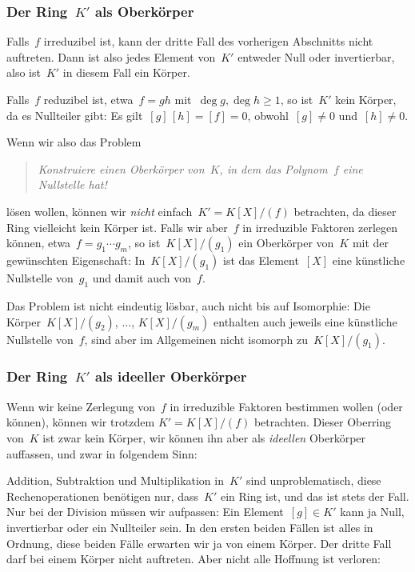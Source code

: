 \documentclass{../../alg2/algblatt}
\begin{document}
\subsubsection*{Der Ring~$K'$ als Oberkörper}

Falls~$f$ irreduzibel ist, kann der dritte Fall des vorherigen Abschnitts nicht
auftreten. Dann ist also jedes Element von~$K'$ entweder Null oder
invertierbar, also ist~$K'$ in diesem Fall ein Körper.

Falls~$f$ reduzibel ist, etwa~$f = gh$ mit~$\deg g, \deg h \geq 1$, so ist~$K'$
kein Körper, da es Nullteiler gibt: Es gilt~$[g]\,[h] = [f] = 0$, obwohl~$[g]
\neq 0$ und~$[h] \neq 0$.

Wenn wir also das Problem
\begin{quote}\emph{Konstruiere einen Oberkörper von~$K$, in dem das Polynom~$f$
eine Nullstelle hat!}\end{quote}
lösen wollen, können wir \emph{nicht} einfach~$K' = K[X]/(f)$ betrachten, da
dieser Ring vielleicht kein Körper ist. Falls wir aber~$f$ in irreduzible
Faktoren zerlegen können, etwa~$f = g_1 \cdots g_m$, so ist~$K[X]/(g_1)$ ein
Oberkörper von~$K$ mit der gewünschten Eigenschaft: In~$K[X]/(g_1)$ ist das
Element~$[X]$ eine künstliche Nullstelle von~$g_1$ und damit auch von~$f$.

Das Problem ist nicht eindeutig lösbar, auch nicht bis auf Isomorphie: Die
Körper~$K[X]/(g_2)$, $\ldots$, $K[X]/(g_m)$ enthalten auch jeweils eine künstliche
Nullstelle von~$f$, sind aber im Allgemeinen nicht isomorph zu~$K[X]/(g_1)$.


\subsubsection*{Der Ring~$K'$ als ideeller Oberkörper}

Wenn wir keine Zerlegung von~$f$ in irreduzible Faktoren bestimmen wollen (oder
können), können wir trotzdem $K' = K[X]/(f)$ betrachten. Dieser Oberring
von~$K$ ist zwar kein Körper, wir können ihn aber als \emph{ideellen}
Oberkörper auffassen, und zwar in folgendem Sinn:

Addition, Subtraktion und Multiplikation in~$K'$ sind unproblematisch, diese
Rechenoperationen benötigen nur, dass~$K'$ ein Ring ist, und das ist stets der
Fall. Nur bei der Division müssen wir aufpassen: Ein Element~$[g] \in K'$ kann
ja Null, invertierbar oder ein Nullteiler sein. In den ersten beiden Fällen ist
alles in Ordnung, diese beiden Fälle erwarten wir ja von einem Körper. Der
dritte Fall darf bei einem Körper nicht auftreten. Aber nicht alle Hoffnung ist
verloren:
\end{document}
